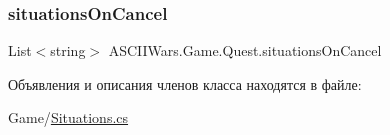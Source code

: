\subsubsection{\texorpdfstring{situations\+On\+Cancel}{situationsOnCancel}}
{\footnotesize\ttfamily List$<$string$>$ A\+S\+C\+I\+I\+Wars.\+Game.\+Quest.\+situations\+On\+Cancel}



Объявления и описания членов класса находятся в файле\+:\begin{DoxyCompactItemize}
\item 
Game/\hyperlink{_situations_8cs}{Situations.\+cs}\end{DoxyCompactItemize}
